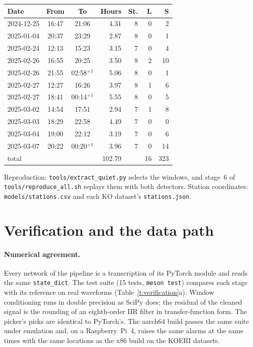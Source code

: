 \documentclass[11pt,a4paper]{article}
\newcommand{\tool}[1]{\nolinkurl{#1}}
\begin{document}
\begin{table}[htbp]
{    \begin{tabular}[t]{@{}lccrrrr@{}}
      \toprule
      Date & From & To & Hours & St. & L & S \\
      \midrule
      2024-12-25 & 16:47 & 21:06 & 4.31 & 8 & 0 & 2 \\
      2025-01-04 & 20:37 & 23:29 & 2.87 & 8 & 0 & 1 \\
      2025-02-24 & 12:13 & 15:23 & 3.15 & 7 & 0 & 4 \\
      2025-02-26 & 16:55 & 20:25 & 3.50 & 8 & 2 & 10 \\
      2025-02-26 & 21:55 & 02:58$^{+1}$ & 5.06 & 8 & 0 & 1 \\
      2025-02-27 & 12:27 & 16:26 & 3.97 & 8 & 1 & 6 \\
      2025-02-27 & 18:41 & 00:14$^{+1}$ & 5.55 & 8 & 0 & 5 \\
      2025-03-02 & 14:54 & 17:51 & 2.94 & 7 & 1 & 8 \\
      2025-03-03 & 18:29 & 22:58 & 4.49 & 7 & 0 & 0 \\
      2025-03-04 & 19:00 & 22:12 & 3.19 & 7 & 0 & 6 \\
      2025-03-07 & 20:22 & 00:20$^{+1}$ & 3.96 & 7 & 0 & 14 \\
      \midrule
      total & & & 102.79 & & 16 & 323 \\
      \bottomrule
  \end{tabular}}
\end{table}

\noindent Reproduction: \tool{tools/extract_quiet.py} selects the windows, and
stage~6 of \tool{tools/reproduce_all.sh} replays them with both detectors. Station coordinates:
\tool{models/stations.csv} and each KO dataset's \tool{stations.json}.

\clearpage
\section{Verification and the data path}\label{s:verification}

\paragraph{Numerical agreement.} Every network of the pipeline is a
transcription of its PyTorch module and reads the same \texttt{state\_dict}.
The test suite (15 tests, \tool{meson test}) compares each stage with its
reference on real waveforms (Table~\ref{t:verification}a). Window conditioning
runs in double precision as SciPy does; the residual of the cleaned signal is
the rounding of an eighth-order IIR filter in transfer-function form. The
picker's picks are identical to PyTorch's. The aarch64 build passes the same
suite under emulation and, on a Raspberry~Pi~4, raises the same alarms at the
same times with the same locations as the x86 build on the KOERI datasets.
\end{document}
